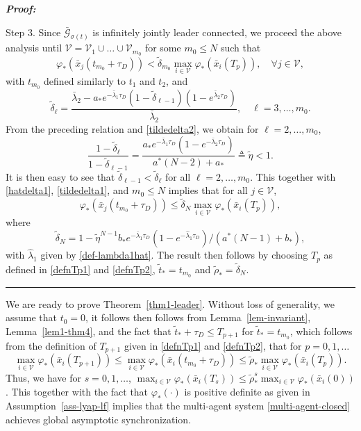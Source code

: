 \documentclass[a4paper, 11pt]{article}
\def \defn{\triangleq}
\newenvironment{IEEEproof}[1][\bf Proof]{\smallskip\par\noindent\textit{#1: }}{\hspace*{\fill} \rule{6pt}{6pt}\smallskip}
\begin{document}
\begin{IEEEproof}
\vspace*{2mm}

\noindent Step 3. Since $\bar{\mathcal{G}}_{\sigma(t)}$ is infinitely jointly leader connected,
we proceed the above analysis until $\mathcal{V}=\mathcal{V}_1 \cup \ldots \cup \mathcal{V}_{m_0}$
for some $m_0 \leq N$ such that
\begin{equation*}
\varphi_*(\bar{x}_{j}(t_{m_0}+\tau_D)) < \tilde{\delta}_{m_0} \max_{i \in \mathcal{V}}\varphi_*(\bar{x}_i(T_p)), \quad \forall j \in \mathcal{V},
\end{equation*}
with $t_{m_0}$ defined similarly to $t_1$ and $t_2$, and
\begin{equation*}\label{tildedeltaell}
\tilde{{\delta}}_\ell =\frac{\bar{\lambda}_2-a_*e^{-\bar{\lambda}_1 \tau_D}(1-\tilde{\delta}_{\ell-1}) (1-e^{\bar{\lambda}_2 \tau_D})}{\bar{\lambda}_2}, \quad \ell=3, \ldots, m_0.
\end{equation*}
From the preceding relation and \eqref{tildedelta2},
we obtain for $\ell=2,\ldots, m_0$,
\[
\frac{1-\tilde{\delta}_{\ell}}{1-\tilde{\delta}_{\ell-1}}=\frac{a_*e^{-\bar{\lambda}_1 \tau_D} (1-e^{-\bar{\lambda}_2 \tau_D})}{a^*(N-2)+a_*}\defn \tilde{\eta}<1.
\]
It is then easy to see that $\tilde{\delta}_{\ell-1} < \tilde{\delta}_{\ell}$ for all $\ell=2, \ldots, m_0$.
This together with \eqref{hatdelta1}, \eqref{tildedelta1}, and $m_0 \leq N$ implies that for all  $j \in \mathcal{V}$,
\[
\varphi_*(\bar{x}_j(t_{m_0}+\tau_D)) \leq \tilde{\delta}_{N} \max_{i \in \mathcal{V}}\varphi_*(\bar{x}_i(T_p)),
\]
where
\[
\tilde{\delta}_N =1- \tilde{\eta}^{N-1}b_*e^{-\bar{\lambda}_1 \tau_D}(1-e^{-\hat{\lambda}_1\tau_D})/({a^*(N-1)+b_*}),
\]
with $\hat{\lambda}_1$ given by \eqref{def-lambda1hat}.
The result then follows by choosing $T_p$ as defined in \eqref{defnTp1} and \eqref{defnTp2}, $\tilde{t}_*=t_{m_0}$ and $\tilde{\rho}_*= \tilde{\delta}_N$.
\end{IEEEproof}

We are ready to prove Theorem~\ref{thm1-leader}. Without loss of generality, we assume that $t_0=0$, it follows then follows from Lemma~\ref{lem-invariant}, Lemma~\ref{lem1-thm4}, and the fact that
$\tilde{t}_*+\tau_D \leq T_{p+1}$ for $\tilde{t}_*=t_{m_0}$, which follows from the definition of $T_{p+1}$ given in \eqref{defnTp1} and \eqref{defnTp2}, that for $p=0,1,\ldots$
\[
\max_{i \in \mathcal{V}}\varphi_*(\bar{x}_i(T_{p+1})) \leq  \max_{i \in \mathcal{V}}\varphi_*(\bar{x}_i(t_{m_0}+\tau_D)) \leq \tilde{\rho}_*  \max_{i \in \mathcal{V}}\varphi_*(\bar{x}_i(T_p)).
\]
Thus, we have for $s=0,1,\ldots$, $\max_{i \in \mathcal{V}}\varphi_*(\bar{x}_i(T_{s})) \leq \tilde{\rho}^s_*   \max_{i \in \mathcal{V}}\varphi_*(\bar{x}_i(0))$. This together with the fact that $\varphi_*(\cdot)$ is positive definite as given in Assumption~\ref{ass-lyap-lf} implies that the multi-agent system \eqref{multi-agent-closed} achieves global asymptotic synchronization.
\end{document}
